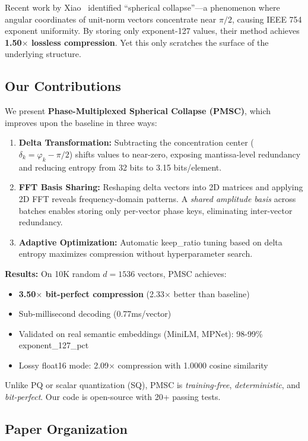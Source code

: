 Recent work by Xiao~\cite{xiao2026spherical} identified ``spherical collapse''—a phenomenon where angular coordinates of unit-norm vectors concentrate near $\pi/2$, causing IEEE 754 exponent uniformity. By storing only exponent-127 values, their method achieves \textbf{1.50$\times$ lossless compression}. Yet this only scratches the surface of the underlying structure.

\subsection{Our Contributions}

We present \textbf{Phase-Multiplexed Spherical Collapse (PMSC)}, which improves upon the baseline in three ways:

\begin{enumerate}
\item \textbf{Delta Transformation:} Subtracting the concentration center ($\delta_k = \varphi_k - \pi/2$) shifts values to near-zero, exposing mantissa-level redundancy and reducing entropy from 32 bits to 3.15 bits/element.
\item \textbf{FFT Basis Sharing:} Reshaping delta vectors into 2D matrices and applying 2D FFT reveals frequency-domain patterns. A \textit{shared amplitude basis} across batches enables storing only per-vector phase keys, eliminating inter-vector redundancy.
\item \textbf{Adaptive Optimization:} Automatic keep\_ratio tuning based on delta entropy maximizes compression without hyperparameter search.
\end{enumerate}

\textbf{Results:} On 10K random $d=1536$ vectors, PMSC achieves:
\begin{itemize}
\item \textbf{3.50$\times$ bit-perfect compression} (2.33$\times$ better than baseline)
\item Sub-millisecond decoding (0.77ms/vector)
\item Validated on real semantic embeddings (MiniLM, MPNet): 98-99\% exponent\_127\_pct
\item Lossy float16 mode: 2.09$\times$ compression with 1.0000 cosine similarity
\end{itemize}

Unlike PQ or scalar quantization (SQ), PMSC is \textit{training-free}, \textit{deterministic}, and \textit{bit-perfect}. Our code is open-source with 20+ passing tests.

\subsection{Paper Organization}


